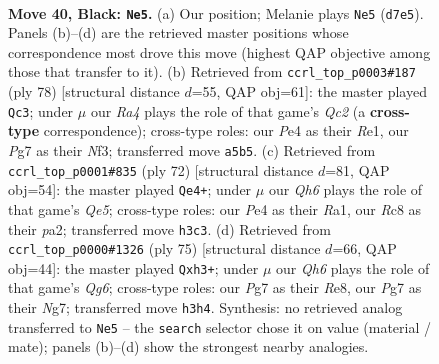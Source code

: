 \documentclass[11pt]{article}
\begin{document}
\clearpage

\begin{figure}[p]\centering
\begin{subfigure}{0.46\textwidth}\centering
\resizebox{\linewidth}{!}{%
\newchessgame
\chessboard[
  setfen={2r3k1/3n2p1/1p4Q1/r2p4/P3p2N/7q/2P2P1n/R2R2K1 b - - 3 40},
  showmover=false,
  pgfstyle=straightmove, color=movearrow, markmove={d7-e5}
]}
\caption{}
\end{subfigure}\hfill
\begin{subfigure}{0.46\textwidth}\centering
\resizebox{\linewidth}{!}{%
\newchessgame
\chessboard[
  setfen={2r1r1k1/pp1R4/4Ppp1/2n4p/2P5/5NqP/2Q3P1/4R1K1 w - - 8 40},
  showmover=false,
  pgfstyle=straightmove, color=movearrow, markmove={c2-c3}
]}
\caption{}
\end{subfigure}
\\[4pt]
\begin{subfigure}{0.46\textwidth}\centering
\resizebox{\linewidth}{!}{%
\newchessgame
\chessboard[
  setfen={1r1r4/3P1ppk/7p/4Q3/2pR4/2P2P1P/pq4PK/R7 w - - 11 37},
  showmover=false,
  pgfstyle=straightmove, color=movearrow, markmove={e5-e4}
]}
\caption{}
\end{subfigure}\hfill
\begin{subfigure}{0.46\textwidth}\centering
\resizebox{\linewidth}{!}{%
\newchessgame
\chessboard[
  setfen={4r2k/6nB/5pQ1/1p1p2p1/2pP4/2P3qP/8/R4R1K b - - 2 38},
  showmover=false,
  pgfstyle=straightmove, color=movearrow, markmove={g3-h3}
]}
\caption{}
\end{subfigure}
\caption{\textbf{Move 40, Black: \texttt{Ne5}.} (a) Our position; Melanie plays \texttt{Ne5} (\texttt{d7e5}). Panels (b)--(d) are the retrieved master positions whose correspondence most drove this move (highest QAP objective among those that transfer to it). (b) Retrieved from \texttt{ccrl\_top\_p0003\#187} (ply 78) [structural distance $d$=55, QAP obj=61]: the master played \texttt{Qc3}; under $\mu$ our \emph{Ra4} plays the role of that game's \emph{Qc2} (a \textbf{cross-type} correspondence); cross-type roles: our \emph{P}e4 as their \emph{R}e1, our \emph{P}g7 as their \emph{N}f3; transferred move \texttt{a5b5}. (c) Retrieved from \texttt{ccrl\_top\_p0001\#835} (ply 72) [structural distance $d$=81, QAP obj=54]: the master played \texttt{Qe4+}; under $\mu$ our \emph{Qh6} plays the role of that game's \emph{Qe5}; cross-type roles: our \emph{P}e4 as their \emph{R}a1, our \emph{R}c8 as their \emph{p}a2; transferred move \texttt{h3c3}. (d) Retrieved from \texttt{ccrl\_top\_p0000\#1326} (ply 75) [structural distance $d$=66, QAP obj=44]: the master played \texttt{Qxh3+}; under $\mu$ our \emph{Qh6} plays the role of that game's \emph{Qg6}; cross-type roles: our \emph{P}g7 as their \emph{R}e8, our \emph{P}g7 as their \emph{N}g7; transferred move \texttt{h3h4}. Synthesis: no retrieved analog transferred to \texttt{Ne5} -- the \texttt{search} selector chose it on value (material / mate); panels (b)--(d) show the strongest nearby analogies.}
\label{fig:thought-m79}
\end{figure}
\end{document}
